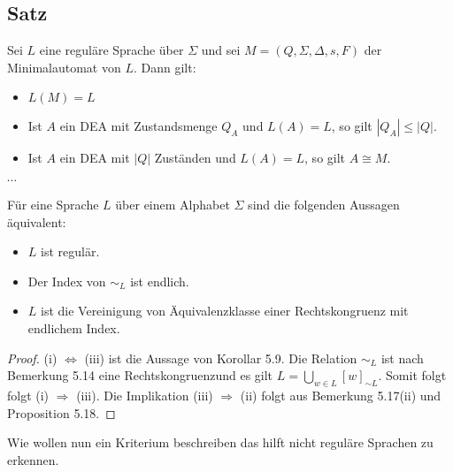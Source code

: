 \subsection{Satz} Sei $L$ eine reguläre Sprache über $\Sigma$ und sei $M = (Q, \Sigma, \Delta, s, F)$ der Minimalautomat von $L$. Dann gilt:
\begin{itemize}
  \item [(i)] $L(M) = L$
  \item [(ii)] Ist $A$ ein DEA mit Zustandsmenge $Q_A$ und $L(A) = L$, so gilt $|Q_A| \leq |Q|$.
  \item [(iii)] Ist $A$ ein DEA mit $|Q|$ Zuständen und $L(A) = L$, so gilt $A \cong M$. 
\end{itemize}

$\cdots$

Für eine Sprache $L$ über einem Alphabet $\Sigma$ sind die folgenden Aussagen äquivalent:
\begin{itemize}
  \item [(i)] $L$ ist regulär.
  \item [(ii)] Der Index von $\sim_{L}$ ist endlich.
  \item [(iii)] $L$ ist die Vereinigung von Äquivalenzklasse einer Rechtskongruenz mit endlichem Index.
\end{itemize}

\begin{proof}
  (i) $\Leftrightarrow$ (iii) ist die Aussage von Korollar 5.9. Die Relation $\sim_L$ ist nach Bemerkung 5.14 eine Rechtskongruenzund es gilt $L = \bigcup \limits_{w \in L} [w]_{\sim L}$. Somit folgt folgt (i) $\Rightarrow$ (iii). Die Implikation (iii) $\Rightarrow$ (ii) folgt aus Bemerkung 5.17(ii) und Proposition 5.18.
\end{proof}

Wie wollen nun ein Kriterium beschreiben das hilft nicht reguläre Sprachen zu erkennen.


